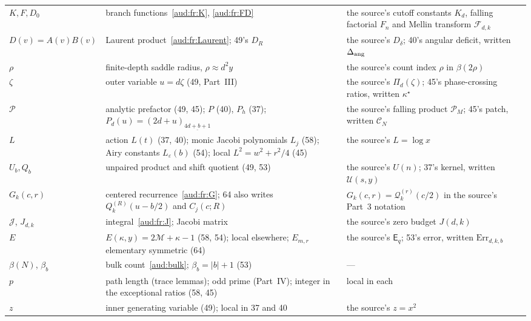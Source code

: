 \documentclass[11pt,a4paper]{article}
\numberwithin{equation}{section}
\newcommand{\fall}[2]{(#1)_{\underline{#2}}}
\begin{document}
{\begin{longtable}{@{}>{\raggedright\arraybackslash}p{}
 >{\raggedright\arraybackslash}p{}
 >{\raggedright\arraybackslash}p{}@{}}
$K,F,D_0$ & branch functions~\eqref{aud:fr:K}, \eqref{aud:fr:FD} & the source's cutoff constants $K_d$, falling factorial $F_n$ and Mellin transform $\mathcal F_{d,k}$\\
$D(v)=A(v)B(v)$ & Laurent product~\eqref{aud:fr:Laurent}; 49's $D_R$ & the source's $D_\delta$; 40's angular deficit, written $\Delta_{\rm ang}$\\
$\rho$ & finite-depth saddle radius, $\rho\approx d^2y$ & the source's count index $\rho$ in $\beta(2\rho)$\\
$\zeta$ & outer variable $u=d\zeta$ (49, Part~III) & the source's $\Pi_d(\zeta)$; 45's phase-crossing ratios, written $\kappa^\star$\\
$\mathcal P$ & analytic prefactor (49, 45); $P$ (40), $P_h$ (37); $P_d(u)=\fall{2d+u}{4d+b+1}$ & the source's falling product $\mathcal P_M$; 45's patch, written $\mathcal C_N$\\
$L$ & action $L(t)$ (37, 40); monic Jacobi polynomials $L_j$ (58); Airy constants $L_\varepsilon(b)$ (54); local $L^2=w^2+r^2/4$ (45) & the source's $L=\log x$\\
$U_b,Q_b$ & unpaired product and shift quotient (49, 53) & the source's $U(n)$; 37's kernel, written $\mathcal U(s,y)$\\
$G_k(c,r)$ & centered recurrence~\eqref{aud:fr:G}; 64 also writes $Q_k^{(R)}(u-b/2)$ and $C_j(c;R)$ & $G_k(c,r)=\mathcal Q_k^{(r)}(c/2)$ in the source's Part~3 notation\\
$\mathcal J$, $J_{d,k}$ & integral~\eqref{aud:fr:J}; Jacobi matrix & the source's zero budget $J(d,k)$\\
$E$ & $E(\kappa,y)=2\mathcal M+\kappa-1$ (58, 54); local elsewhere; $E_{m,r}$ elementary symmetric (64) & the source's $\mathsf E_q$; 53's error, written $\mathrm{Err}_{d,k,b}$\\
$\beta(N)$, $\beta_b$ & bulk count~\eqref{aud:bulk}; $\beta_b=|b|+1$ (53) & ---\\
$p$ & path length (trace lemmas); odd prime (Part~IV); integer in the exceptional ratios (58, 45) & local in each\\
$z$ & inner generating variable (49); local in 37 and 40 & the source's $z=x^2$\\
\bottomrule
\end{longtable}}
\end{document}
